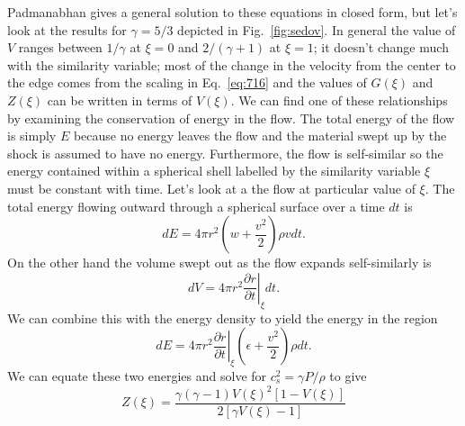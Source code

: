 Padmanabhan gives a general solution to these equations in closed
form, but let's look at the results for $\gamma=5/3$ depicted in
Fig.~\ref{fig:sedov}.   In general the value of $V$ ranges between $1/\gamma$ at
$\xi=0$ and $2/(\gamma+1)$ at $\xi=1$; it doesn't change much
with the similarity variable; most of the change in the velocity from
the center to the edge comes from the scaling in Eq.~\ref{eq:716}
and the values of $G(\xi)$ and $Z(\xi)$ can be written in terms of
$V(\xi)$.   We can find one of these relationships by examining the
conservation of energy in the flow.  The total energy of the flow is
simply $E$ because no energy leaves the flow and the material swept up
by the shock is assumed to have no energy.  Furthermore, the flow is
self-similar so the energy contained within a spherical shell labelled
by the similarity variable $\xi$ must be constant with time.  Let's
look at a the flow at particular value of $\xi$.  The total energy
flowing outward through a spherical surface over a time $dt$ is 
\begin{equation}
d E = 4\pi r^2 \left ( w+\frac{v^2}{2}\right ) \rho v dt.
\end{equation}
On the other hand the volume swept out
as the flow expands self-similarly is 
\begin{equation}
d V = 4 \pi r^2 \left .\frac{\partial r}{\partial t}\right |_\xi d t.
\end{equation}
We can combine this with the energy density to yield the energy in the region
\begin{equation} 
d E = 4 \pi r^2 \left .\frac{\partial r}{\partial t}\right |_\xi
\left ( \epsilon + \frac{v^2}{2} \right ) \rho d t.
\end{equation}
We can equate these two energies and solve for $c_s^2 = \gamma P/\rho$ to give
\begin{equation}
Z(\xi) = \frac{\gamma(\gamma-1) V(\xi)^2 \left [ 1-V(\xi) \right ]}{2
  \left [ \gamma V(\xi) -1 \right ]}
\end{equation}


